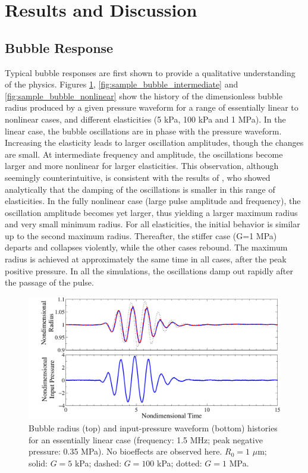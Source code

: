 \section{Results and Discussion}
\label{sec:usbe_bubble_results}

\subsection{Bubble Response}
Typical bubble responses are first shown to provide a qualitative
understanding of the physics.  Figures \ref{fig:sample_bubble_linear},
\ref{fig:sample_bubble_intermediate} and
\ref{fig:sample_bubble_nonlinear} show the history of the
dimensionless bubble radius produced by a given pressure waveform for
a range of essentially linear to nonlinear cases, and different
elasticities (5 kPa, 100 kPa and 1 MPa). In the linear case, the
bubble oscillations are in phase with the pressure
waveform. Increasing the elasticity leads to larger oscillation
amplitudes, though the changes are small. At intermediate frequency
and amplitude, the oscillations become larger and more nonlinear for
larger elasticities. This observation, although seemingly
counterintuitive, is consistent with the results of
\cite{Johnsen2012}, who showed analytically that the damping of the
oscillations is smaller in this range of elasticities.  In the fully
nonlinear case (large pulse amplitude and frequency), the oscillation
amplitude becomes yet larger, thus yielding a larger maximum radius
and very small minimum radius.  For all elasticities, the initial
behavior is similar up to the second maximum radius. Thereafter, the
stiffer case (G=1 MPa) departs and collapses violently, while the
other cases rebound. The maximum radius is achieved at approximately
the same time in all cases, after the peak positive pressure. In all
the simulations, the oscillations damp out rapidly after the passage
of the pulse.

\begin{figure}[!t]
  \centering \includegraphics[width=\textwidth]{figs/bubble_figs/Rt_linear}
  \caption[Bubble radius and input-pressure
    waveform histories for an essentially linear case (frequency: 1.5
    MHz; peak negative pressure: 0.35 MPa)]{Bubble radius (top) and input-pressure
    waveform (bottom) histories for an essentially linear case (frequency: 1.5
    MHz; peak negative pressure: 0.35 MPa). No bioeffects are observed
    here. $R_0=1$ $\mu$m; solid: $G=5$ kPa; dashed: $G=100$ kPa;
    dotted: $G=1$ MPa.}
  \label{fig:sample_bubble_linear}
\end{figure}

